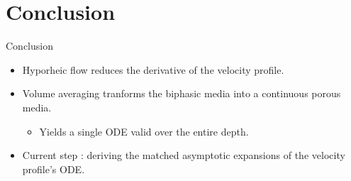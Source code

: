 \section{Conclusion}

\begin{frame}{Conclusion}

    \begin{itemize}
        \item Hyporheic flow reduces the derivative of the velocity profile.
        \item Volume averaging tranforms the biphasic media into a continuous porous media.
        \begin{itemize}
            \item[\color{toraval}$\rightarrow$] Yields a single ODE valid over the entire depth.
        \end{itemize}
        \item[\color{toraval}$\hookrightarrow$] Current step : deriving the matched asymptotic expansions of the velocity profile's ODE.
    \end{itemize}
\end{frame}
